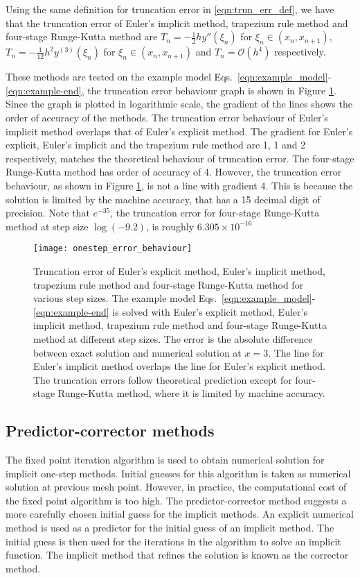 Using the same definition for truncation error in \ref{eqn:trun_err_def}, we have that the truncation error of Euler's implicit method, trapezium rule method and four-stage Runge-Kutta method are $T_n = -\frac{1}{2}hy''(\xi_n)$ for $\xi_n \in (x_n, x_{n+1})$, $T_n = -\frac{1}{12}h^2y^{(3)}(\xi_n)$ for $\xi_n \in (x_n, x_{n+1})$ and $T_n = \mathcal{O}(h^4)$ respectively.

These methods are tested on the example model Eqs.~\eqref{eqn:example_model}-\eqref{eqn:example-end}, the truncation error behaviour graph is shown in Figure \ref{fig:onestep_error_behaviour}. Since the graph is plotted in logarithmic scale, the gradient of the lines shows the order of accuracy of the methods. The truncation error behaviour of Euler's implicit method overlaps that of Euler's explicit method. The gradient for Euler's explicit, Euler's implicit and the trapezium rule method are 1, 1 and 2 respectively, matches the theoretical behaviour of truncation error. The four-stage Runge-Kutta method has order of accuracy of 4. However, the truncation error behaviour, as shown in Figure \ref{fig:onestep_error_behaviour}, is not a line with gradient 4. This is because the solution is limited by the machine accuracy, that has a 15 decimal digit of precision. Note that $e^{-35}$, the truncation error for four-stage Runge-Kutta method at step size $\log(-9.2)$, is roughly $6.305 \times 10^{-16}$ 

\begin{figure}
    \texttt{[image: onestep\_error\_behaviour]}
    \caption{Truncation error of Euler's explicit method, Euler's implicit method, trapezium rule method and four-stage Runge-Kutta method for various step sizes. The example model Eqs.~\eqref{eqn:example_model}-\eqref{eqn:example-end} is solved with Euler's explicit method, Euler's implicit method, trapezium rule method and four-stage Runge-Kutta method at different step sizes. The error is the absolute difference between exact solution and numerical solution at $x=3$. The line for Euler's implicit method overlaps the line for Euler's explicit method. The truncation errors follow theoretical prediction except for four-stage Runge-Kutta method, where it is limited by machine accuracy.}
    \label{fig:onestep_error_behaviour}
\end{figure}

\subsection{Predictor-corrector methods}
\label{sec:predictor-corrector}
The fixed point iteration algorithm is used to obtain numerical solution for implicit one-step methods. Initial guesses for this algorithm is taken as numerical solution at previous mesh point. However, in practice, the computational cost of the fixed point algorithm is too high. The predictor-corrector method suggests a more carefully chosen initial guess for the implicit methods. An explicit numerical method is used as a predictor for the initial guess of an implicit method. The initial guess is then used for the iterations in the algorithm to solve an implicit function. The implicit method that refines the solution is known as the corrector method. 

